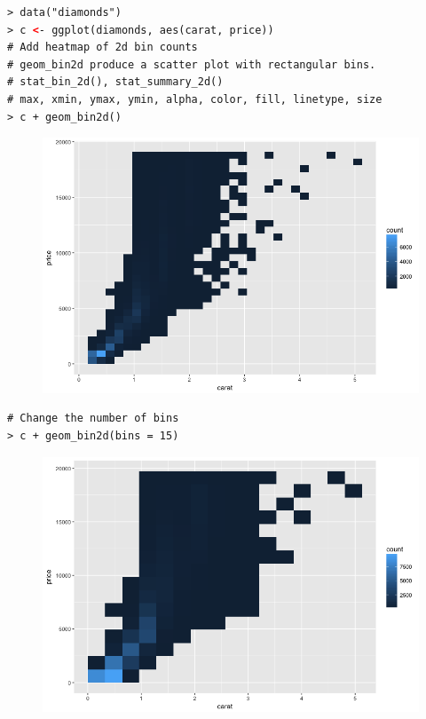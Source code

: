 \begin{lstlisting}[language=html]
> data("diamonds")
> c <- ggplot(diamonds, aes(carat, price))
# Add heatmap of 2d bin counts
# geom_bin2d produce a scatter plot with rectangular bins.
# stat_bin_2d(), stat_summary_2d()
# max, xmin, ymax, ymin, alpha, color, fill, linetype, size
> c + geom_bin2d()
\end{lstlisting}
\begin{figure}[H]\begin{center}\includegraphics[scale=1 ]{ilu/bg56.png}\end{center}\end{figure}
\begin{lstlisting}[language=html]
# Change the number of bins
> c + geom_bin2d(bins = 15)
\end{lstlisting}
\begin{figure}[H]\begin{center}\includegraphics[scale=1 ]{ilu/bg57.png}\end{center}\end{figure}
